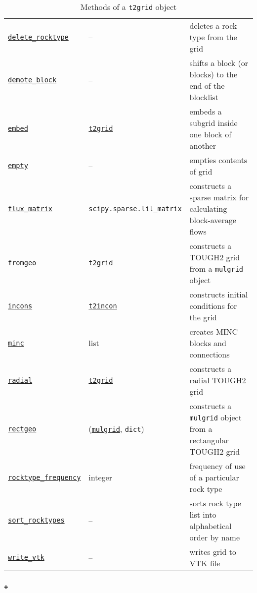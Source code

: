 \begin{table}
\begin{center}
\begin{tabular}{|l|l|p{65mm}|}
      \hyperref[sec:t2grid:delete_rocktype]{\texttt{delete\_rocktype}} & -- & deletes a rock type from the grid\\
      \hyperref[sec:t2grid:demote_block]{\texttt{demote\_block}} & -- & shifts a block (or blocks) to the end of the blocklist\\
      \hyperref[sec:t2grid:embed]{\texttt{embed}} & \hyperref[t2grids]{\texttt{t2grid}} & embeds a subgrid inside one block of another \\
      \hyperref[sec:t2grid:empty]{\texttt{empty}} & -- & empties contents of grid\\
      \hyperref[sec:t2grid:flux_matrix]{\texttt{flux\_matrix}} & \texttt{scipy.sparse.lil\_matrix} & constructs a sparse matrix for calculating block-average flows \\
      \hyperref[sec:t2grid:fromgeo]{\texttt{fromgeo}} & \hyperref[t2grids]{\texttt{t2grid}} & constructs a TOUGH2 grid from a \texttt{mulgrid} object\\
      \hyperref[sec:t2grid:incons]{\texttt{incons}} & \hyperref[incons]{\texttt{t2incon}} & constructs initial conditions for the grid\\
      \hyperref[sec:t2grid:MINC]{\texttt{minc}} & list & creates MINC blocks and connections\\
      \hyperref[sec:t2grid:radial]{\texttt{radial}} & \hyperref[t2grids]{\texttt{t2grid}} & constructs a radial TOUGH2 grid\\
      \hyperref[sec:t2grid:rectgeo]{\texttt{rectgeo}} & (\hyperref[mulgrids]{\texttt{mulgrid}}, \texttt{dict}) & constructs a \texttt{mulgrid} object from a rectangular TOUGH2 grid\\
      \hyperref[sec:t2grid:rocktype_frequency]{\texttt{rocktype\_frequency}} & integer & frequency of use of a particular rock type\\
      \hyperref[sec:t2grid:sort_rocktypes]{\texttt{sort\_rocktypes}} & -- & sorts rock type list into alphabetical order by name\\
      \hyperref[sec:t2grid:write_vtk]{\texttt{write\_vtk}} & -- & writes grid to VTK file\\
      \hline
    \end{tabular}
    \caption{Methods of a \texttt{t2grid} object}
    \label{tb:t2grid_methods}
  \end{center}
\end{table}

\begin{snugshade}
\subsubsection{\texttt{+}}
\end{snugshade}
\label{sec:t2grid:plus}

